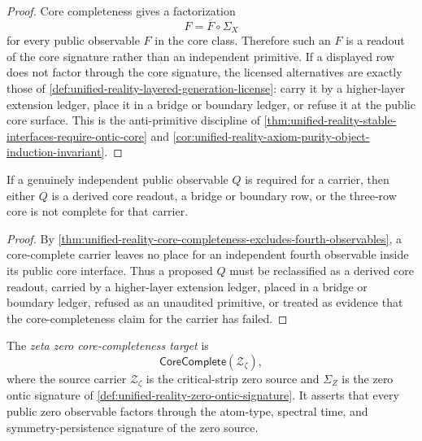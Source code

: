 \begin{proof}
Core completeness gives a factorization
$$
F=\overline F\circ\Sigma_X
$$
for every public observable $F$ in the core class.  Therefore such an
$F$ is a readout of the core signature rather than an independent
primitive.  If a displayed row does not factor through the core
signature, the licensed alternatives are exactly those of
\autoref{def:unified-reality-layered-generation-license}: carry it by a
higher-layer extension ledger, place it in a bridge or boundary ledger,
or refuse it at the public core surface.  This is the anti-primitive
discipline of
\autoref{thm:unified-reality-stable-interfaces-require-ontic-core} and
\autoref{cor:unified-reality-axiom-purity-object-induction-invariant}.
\end{proof}

\begin{corollary}
\label{cor:unified-reality-fourth-commonality-theory-extension-signal}
If a genuinely independent public observable $Q$ is required for a
carrier, then either $Q$ is a derived core readout, a bridge or boundary
row, or the three-row core is not complete for that carrier.
\end{corollary}

\begin{proof}
By
\autoref{thm:unified-reality-core-completeness-excludes-fourth-observables},
a core-complete carrier leaves no place for an independent fourth
observable inside its public core interface.  Thus a proposed $Q$ must
be reclassified as a derived core readout, carried by a higher-layer
extension ledger, placed in a bridge or boundary ledger, refused as an
unaudited primitive, or treated as evidence that the core-completeness
claim for the carrier has failed.
\end{proof}

\begin{definition}
\label{def:unified-reality-zeta-zero-core-completeness-target}
The \emph{zeta zero core-completeness target} is
$$
\mathsf{CoreComplete}(\mathcal Z_{\zeta}),
$$
where the source carrier $\mathcal Z_{\zeta}$ is the critical-strip zero
source and $\Sigma_Z$ is the zero ontic signature of
\autoref{def:unified-reality-zero-ontic-signature}.  It asserts that
every public zero observable factors through the atom-type, spectral
time, and symmetry-persistence signature of the zero source.
\end{definition}


